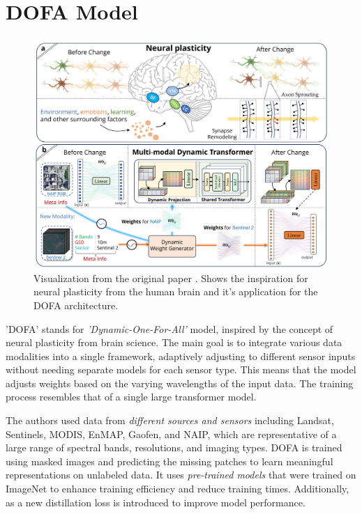 
\section{DOFA Model}
\label{sec:dofa}

\begin{figure}[h]
	\centering
	\includegraphics[width=\columnwidth]{images/dofa-concept.png}
	\caption{Visualization from the original paper \cite{dofa}. Shows the inspiration for neural plasticity from the human brain and it's application for the DOFA architecture.}
	\label{fig:dofa-concept}
\end{figure}

'DOFA' stands for \emph{'Dynamic-One-For-All'} model, inspired by the concept of neural plasticity from brain science. The main goal is to integrate various data modalities into a single framework, adaptively adjusting to different sensor inputs without needing separate models for each sensor type. This means that the model adjusts weights based on the varying wavelengths of the input data. The training process resembles that of a single large transformer model.

The authors used data from \emph{different sources and sensors} including Landsat, Sentinels, MODIS, EnMAP, Gaofen, and NAIP, which are representative of a large range of spectral bands, resolutions, and imaging types. DOFA is trained using masked images and predicting the missing patches to learn meaningful representations on unlabeled data. It uses \emph{pre-trained models} that were trained on ImageNet to enhance training efficiency and reduce training times. Additionally, as a new distillation loss is introduced to improve model performance.


